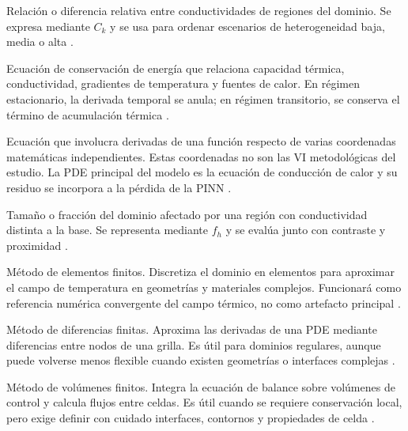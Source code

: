 \begin{description}[style=nextline,itemsep=0.5\baselineskip,parsep=0pt,topsep=0.25\baselineskip]
  \item[Contraste de conductividad.] Relación o diferencia relativa entre conductividades de regiones del dominio. Se expresa mediante $C_k$ y se usa para ordenar escenarios de heterogeneidad baja, media o alta \parencites{farouki1981thermal,devries1966thermal}[1,6--9]{khumalo2025}[1,10,16]{kim2025}.

  \item[Ecuación de conducción de calor.] Ecuación de conservación de energía que relaciona capacidad térmica, conductividad, gradientes de temperatura y fuentes de calor. En régimen estacionario, la derivada temporal se anula; en régimen transitorio, se conserva el término de acumulación térmica \parencites{carslaw1959conduction,kakac2018heatConduction,hahn2012heatConduction}[1,3]{xing2023}[1,3,16]{pan2025}.

  \item[Ecuación diferencial en derivadas parciales o PDE.] Ecuación que involucra derivadas de una función respecto de varias coordenadas matemáticas independientes. Estas coordenadas no son las VI metodológicas del estudio. La PDE principal del modelo es la ecuación de conducción de calor y su residuo se incorpora a la pérdida de la PINN \parencites[686--690]{raissi2019}[1--2]{lawal2022}.

  \item[Extensión de heterogeneidad.] Tamaño o fracción del dominio afectado por una región con conductividad distinta a la base. Se representa mediante $f_h$ y se evalúa junto con contraste y proximidad \parencites[4--6]{enescu2021}[1,6--9]{khumalo2025}[1,10,16]{kim2025}.

  \item[FEM.] Método de elementos finitos. Discretiza el dominio en elementos para aproximar el campo de temperatura en geometrías y materiales complejos. Funcionará como referencia numérica convergente del campo térmico, no como artefacto principal \parencites[4--6]{enescu2021}{patankar1980numerical}[3--4,93--99]{cigre2025}.

  \item[FDM.] Método de diferencias finitas. Aproxima las derivadas de una PDE mediante diferencias entre nodos de una grilla. Es útil para dominios regulares, aunque puede volverse menos flexible cuando existen geometrías o interfaces complejas \parencites{patankar1980numerical}[3--4,93--99]{cigre2025}.

  \item[FVM.] Método de volúmenes finitos. Integra la ecuación de balance sobre volúmenes de control y calcula flujos entre celdas. Es útil cuando se requiere conservación local, pero exige definir con cuidado interfaces, contornos y propiedades de celda \parencite{patankar1980numerical}.


\end{description}
